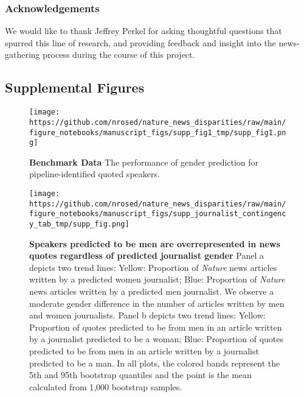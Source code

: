 \hypertarget{acknowledgements}{%
\subsubsection{Acknowledgements}\label{acknowledgements}}

We would like to thank Jeffrey Perkel for asking thoughtful questions that spurred this line of research, and providing feedback and insight into the news-gathering process during the course of this project.

\hypertarget{supplemental-figures}{%
\subsection{Supplemental Figures}\label{supplemental-figures}}

\begin{fignos:tagged-figure}[Supplemental 1]

\begin{figure}
\hypertarget{fig:suppfig1}{%
\centering
\texttt{[image: https://github.com/nrosed/nature\_news\_disparities/raw/main/figure\_notebooks/manuscript\_figs/supp\_fig1\_tmp/supp\_fig1.png]}
\caption{\textbf{Benchmark Data }
The performance of gender prediction for pipeline-identified quoted speakers.}\label{fig:suppfig1}
}
\end{figure}

\end{fignos:tagged-figure}

\begin{fignos:tagged-figure}[Supplemental 2]

\begin{figure}
\hypertarget{fig:suppfig_j_gender}{%
\centering
\texttt{[image: https://github.com/nrosed/nature\_news\_disparities/raw/main/figure\_notebooks/manuscript\_figs/supp\_journalist\_contingency\_tab\_tmp/supp\_fig.png]}
\caption{\textbf{Speakers predicted to be men are overrepresented in news quotes regardless of predicted journalist gender}
Panel a depicts two trend lines: Yellow: Proportion of \emph{Nature} news articles written by a predicted women journalist; Blue: Proportion of \emph{Nature} news articles written by a predicted men journalist.
We observe a moderate gender difference in the number of articles written by men and women journalists.
Panel b depicts two trend lines: Yellow: Proportion of quotes predicted to be from men in an article written by a journalist predicted to be a woman; Blue: Proportion of quotes predicted to be from men in an article written by a journalist predicted to be a man.
In all plots, the colored bands represent the 5th and 95th bootstrap quantiles and the point is the mean calculated from 1,000 bootstrap samples.}\label{fig:suppfig_j_gender}
}
\end{figure}

\end{fignos:tagged-figure}

